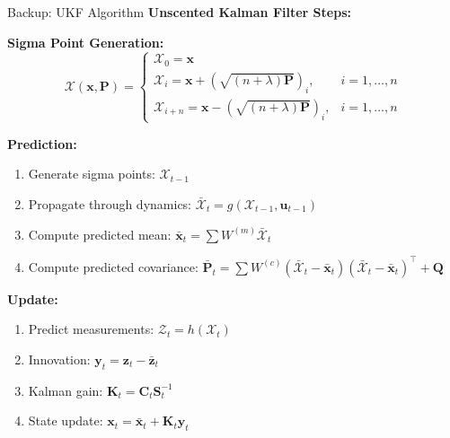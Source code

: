 \documentclass[aspectratio=169]{beamer}
\begin{document}
\begin{frame}[allowframebreaks]{Backup: UKF Algorithm}
\textbf{Unscented Kalman Filter Steps:}

\vspace{0.5em}

\textbf{Sigma Point Generation:}
\begin{equation*}
    \mathcal{X}(\mathbf{x}, \mathbf{P}) =
\begin{cases}
    \mathcal{X}_0 = \mathbf{x} \\
    \mathcal{X}_i = \mathbf{x} + \left( \sqrt{(n + \lambda) \mathbf{P}} \right)_i, & i = 1, \ldots, n \\
    \mathcal{X}_{i+n} = \mathbf{x} - \left( \sqrt{(n + \lambda) \mathbf{P}} \right)_i, & i = 1, \ldots, n
\end{cases}
\end{equation*}

\framebreak

\textbf{Prediction:}
\begin{enumerate}
    \item Generate sigma points: $\mathcal{X}_{t-1}$
    \item Propagate through dynamics: $\bar{\mathcal{X}}_t = g(\mathcal{X}_{t-1}, \mathbf{u}_{t-1})$
    \item Compute predicted mean: $\bar{\mathbf{x}}_t = \sum W^{(m)} \bar{\mathcal{X}}_t$
    \item Compute predicted covariance: $\bar{\mathbf{P}}_t = \sum W^{(c)} (\bar{\mathcal{X}}_t - \bar{\mathbf{x}}_t)(\bar{\mathcal{X}}_t - \bar{\mathbf{x}}_t)^\intercal + \mathbf{Q}$
\end{enumerate}

\textbf{Update:}
\begin{enumerate}
    \item Predict measurements: $\mathcal{Z}_t = h(\mathcal{X}_t)$
    \item Innovation: $\mathbf{y}_t = \mathbf{z}_t - \bar{\mathbf{z}}_t$
    \item Kalman gain: $\mathbf{K}_t = \mathbf{C}_t \mathbf{S}_t^{-1}$
    \item State update: $\mathbf{x}_t = \bar{\mathbf{x}}_t + \mathbf{K}_t \mathbf{y}_t$
\end{enumerate}
\end{frame}
\end{document}
